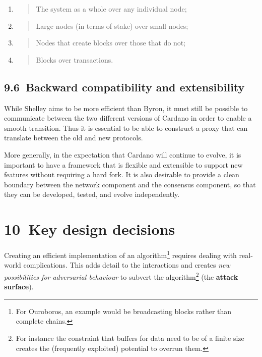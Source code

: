 \documentclass[11pt,a4paper]{article}
\begin{document}
\begin{enumerate}
\def\labelenumi{\arabic{enumi}.}
\item
  \begin{quote}
  The system as a whole over any individual node;
  \end{quote}
\item
  \begin{quote}
  Large nodes (in terms of stake) over small nodes;
  \end{quote}
\item
  \begin{quote}
  Nodes that create blocks over those that do not;
  \end{quote}
\item
  \begin{quote}
  Blocks over transactions.
  \end{quote}
\end{enumerate}

\hypertarget{backward-compatibility-and-extensibility}{%
\subsection{​9.6​~Backward compatibility and
extensibility}\label{backward-compatibility-and-extensibility}}

While Shelley aims to be more efficient than Byron, it must still be
possible to communicate between the two different versions of Cardano in
order to enable a smooth transition. Thus it is essential to be able to
construct a proxy that can translate between the old and new protocols.

More generally, in the expectation that Cardano will continue to evolve,
it is important to have a framework that is flexible and extensible to
support new features without requiring a hard fork. It is also desirable
to provide a clean boundary between the network component and the
consensus component, so that they can be developed, tested, and evolve
independently.

\hypertarget{key-design-decisions}{%
\section{​10​~Key design decisions}\label{key-design-decisions}}

Creating an efficient implementation of an algorithm\footnote{For
  Ouroboros, an example would be broadcasting blocks rather than
  complete chains.} requires dealing with real-world complications. This
adds detail to the interactions and creates \emph{new possibilities for
adversarial behaviour} to subvert the algorithm\footnote{For instance
  the constraint that buffers for data need to be of a finite size
  creates the (frequently exploited) potential to overrun them.} (the
\textbf{attack surface}).
\end{document}

